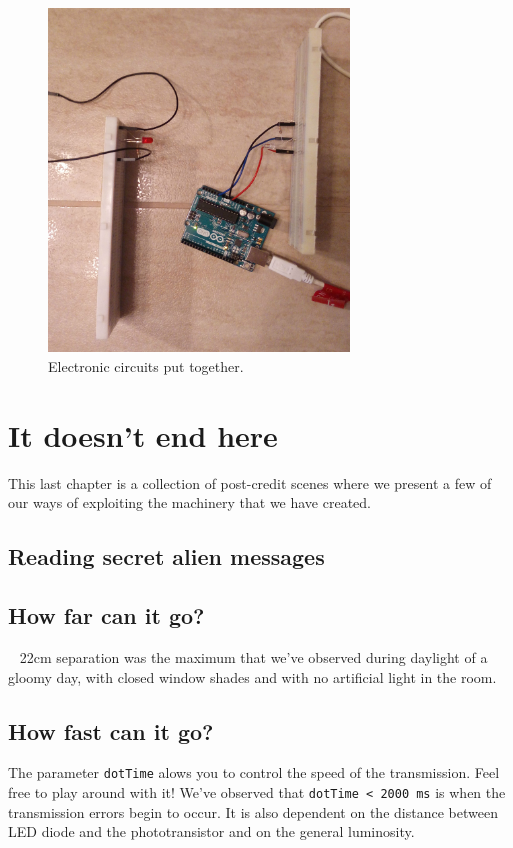 \documentclass[12pt]{report}
\begin{document}
\begin{figure}[H]
\centering\includegraphics[width=8cm]{circuits}
\caption{Electronic circuits put together.}				
\label{fig:circuits_pic}
\end{figure}



\chapter{It doesn't end here}

This last chapter is a collection of post-credit scenes where we present a few of our ways of exploiting the machinery that we have created.

\section{Reading secret alien messages}





\section{How far can it go?}

~ 22cm separation was the maximum that we've observed during daylight of a gloomy day, with closed window shades and with no artificial light in the room.


\section{How fast can it go?}

The parameter \verb|dotTime| alows you to control the speed of the transmission. Feel free to play around with it! We've observed that \verb|dotTime < 2000 ms| is when the transmission errors begin to occur. It is also dependent on the distance between LED diode and the phototransistor and on the general luminosity.
\end{document}
